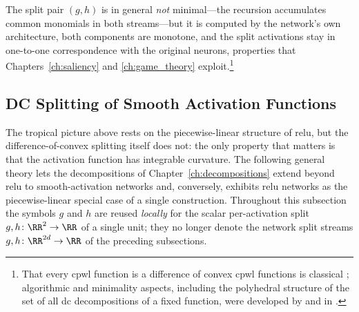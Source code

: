 The split pair $(g, h)$ is in general \emph{not} minimal---the recursion accumulates common monomials in both streams---but it is computed by the network's own architecture, both components are monotone, and the split activations stay in one-to-one correspondence with the original neurons, properties that Chapters~\ref{ch:saliency} and \ref{ch:game_theory} exploit.\footnote{That every \ac{cpwl} function is a difference of convex \ac{cpwl} functions is classical \parencite{Melzer1986_PLasDC,Kripfganz1987_PWAasDC,Zalgaller2000_DCRepresentation}; algorithmic and minimality aspects, including the polyhedral structure of the set of all \ac{dc} decompositions of a fixed function, were developed by \textcite{Griewank2020_PolyhedralDCDecomposition} and in \parencite{Brandenburg2025_DecompositionPolyhedra,Koutschan2024_MinimalArity}.}

\subsection{DC Splitting of Smooth Activation Functions}\label{sec:dc_splitting_smooth}

The tropical picture above rests on the piecewise-linear structure of \ac{relu}, but the difference-of-convex splitting itself does not: the only property that matters is that the activation function has integrable curvature. The following general theory lets the decompositions of Chapter~\ref{ch:decompositions} extend beyond \ac{relu} to smooth-activation networks and, conversely, exhibits \ac{relu} networks as the piecewise-linear special case of a single construction. Throughout this subsection the symbols $g$ and $h$ are reused \emph{locally} for the scalar per-activation split $g, h \colon \RR^2 \to \RR$ of a single unit; they no longer denote the network split streams $g, h \colon \RR^{2d} \to \RR$ of the preceding subsections.

